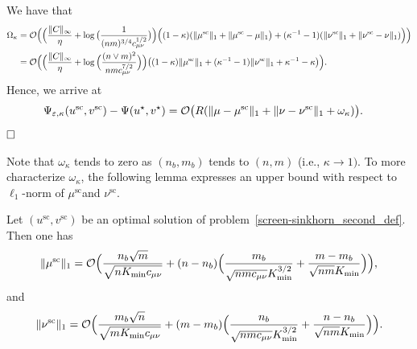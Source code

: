 We have that 
\begin{align*}
\Omega_{\kappa} &=\mathcal{O}\Big(\Big(\frac{\|C\|_\infty}{\eta} + \log\big(\frac{1}{(nm)^{3/4} c_{\mu\nu}^{1/2}}\big)\Big)\Big((1- \kappa)(\|{\mu}^{\text{sc}}\|_1 +\|\mu^{\text{sc}} - \mu\|_1\big) + (\kappa^{-1} - 1)(\|{\nu}^{\text{sc}}\|_1+\|\nu^{\text{sc}} - \nu\|_1)\Big)\Big)\\
&= \mathcal{O}\Big(\Big(\frac{\|C\|_\infty}{\eta} + \log\Big(\frac{(n\vee m)^2}{nmc_{\mu\nu}^{7/2}}\Big)\Big)\big((1- \kappa)\|\mu^{\text{sc}}\|_1 + (\kappa^{-1} - 1)\|\nu^{\text{sc}}\|_1 + \kappa^{-1} - \kappa\big)\Big).
\end{align*}
Hence, we arrive at 
\begin{align*}
\Psi_{\varepsilon, \kappa}(u^{\text{sc}} ,v^{\text{sc}}) -\Psi(u^\star, v^\star) 
& = \mathcal{O}\big(R(\|\mu - {\mu}^{\text{sc}}\|_1 + \|\nu - \nu^{\text{sc}}\|_1 + \omega_{\kappa})\big).
\end{align*}
$\hfill\square$

Note that $\omega_{\kappa}$ tends to zero as $(n_b,m_b)$ tends to $(n,m)$ (i.e., $\kappa \rightarrow 1)$. To more characterize $\omega_\kappa$, the following 
lemma expresses an upper bound with respect to $\ell_1$-norm of $\mu^{\text{sc}}$and $\nu^{\text{sc}}$. 
\begin{lemma}
\label{lemma_bounds_on_marginals}
Let $(u^{\text{sc}}, v^{\text{sc}})$ be an optimal solution of problem~\eqref{screen-sinkhorn_second_def}.
Then one has 
\begin{align}
\label{l1-norm-mu-sc}
\|\mu^{\text{sc}}\|_1 = \mathcal{O}\Big(\frac{n_b\sqrt{m}}{\sqrt{nK_{\min}c_{\mu\nu}}} + (n-n_b)\Big(\frac{m_b}{\sqrt{nmc_{\mu\nu}}K_{\min}^{3/2}} + \frac{m-m_b}{\sqrt{nm}K_{\min}}\Big)\Big),
\end{align}
and
\begin{align}
\label{l1-norm-nu-sc}
\|\nu^{\text{sc}}\|_1 = \mathcal{O}\Big(\frac{m_b\sqrt{n}}{\sqrt{mK_{\min}c_{\mu\nu}}} + (m-m_b)\Big(\frac{n_b}{\sqrt{nmc_{\mu\nu}}K_{\min}^{3/2}} + \frac{n-n_b}{\sqrt{nm}K_{\min}}\Big)\Big).
\end{align}
\end{lemma}

